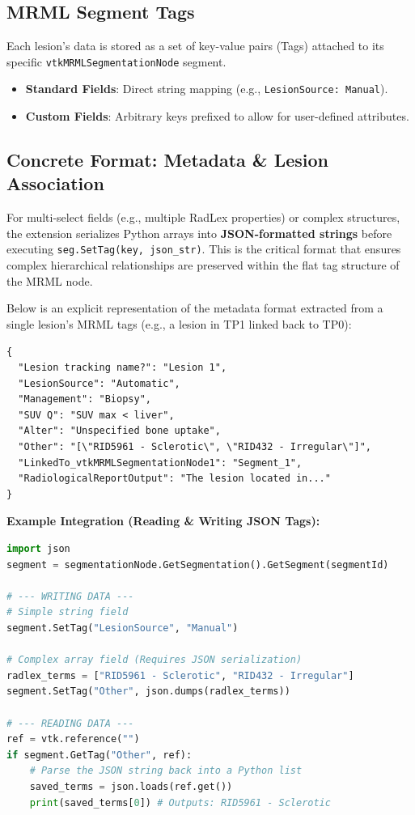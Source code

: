 \documentclass[a4paper,10pt]{article}
\begin{document}
\subsection{MRML Segment Tags}
Each lesion's data is stored as a set of key-value pairs (Tags) attached to its specific \texttt{vtkMRMLSegmentationNode} segment.
\begin{itemize}
    \item \textbf{Standard Fields}: Direct string mapping (e.g., \texttt{LesionSource: Manual}).
    \item \textbf{Custom Fields}: Arbitrary keys prefixed to allow for user-defined attributes.
\end{itemize}

\subsection{Concrete Format: Metadata \& Lesion Association}
For multi-select fields (e.g., multiple RadLex properties) or complex structures, the extension serializes Python arrays into \textbf{JSON-formatted strings} before executing \texttt{seg.SetTag(key, json\_str)}. This is the critical format that ensures complex hierarchical relationships are preserved within the flat tag structure of the MRML node.

Below is an explicit representation of the metadata format extracted from a single lesion's MRML tags (e.g., a lesion in TP1 linked back to TP0):

\begin{lstlisting}[caption=Example of a single Lesion Segment's MRML Tag Payload]
{
  "Lesion tracking name?": "Lesion 1",
  "LesionSource": "Automatic",
  "Management": "Biopsy",
  "SUV Q": "SUV max < liver",
  "Alter": "Unspecified bone uptake",
  "Other": "[\"RID5961 - Sclerotic\", \"RID432 - Irregular\"]",
  "LinkedTo_vtkMRMLSegmentationNode1": "Segment_1",
  "RadiologicalReportOutput": "The lesion located in..."
}
\end{lstlisting}

\textbf{Example Integration (Reading \& Writing JSON Tags):}
\begin{lstlisting}[language=Python]
import json
segment = segmentationNode.GetSegmentation().GetSegment(segmentId)

# --- WRITING DATA ---
# Simple string field
segment.SetTag("LesionSource", "Manual")

# Complex array field (Requires JSON serialization)
radlex_terms = ["RID5961 - Sclerotic", "RID432 - Irregular"]
segment.SetTag("Other", json.dumps(radlex_terms))

# --- READING DATA ---
ref = vtk.reference("")
if segment.GetTag("Other", ref):
    # Parse the JSON string back into a Python list
    saved_terms = json.loads(ref.get())
    print(saved_terms[0]) # Outputs: RID5961 - Sclerotic
\end{lstlisting}
\end{document}
